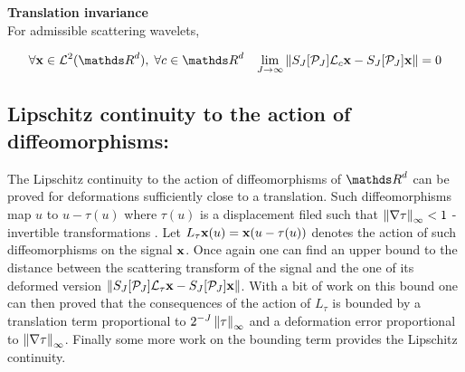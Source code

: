 \documentclass[a4paper,11pt]{report}
\begin{document}
			\begin{thm} \textbf{Translation invariance}\\
				For admissible scattering wavelets,
				
				\begin{equation}
					\forall \bfx \in \mcalL^{2}(\dsR^{d}), \; \forall c \in \dsR^{d} \;\;\; \lim_{J \rightarrow \infty} \norm{S_{J}[\mcalP_{J}]\mcalL_{c}\bfx - S_{J}[\mcalP_{J}]\bfx} = 0
					\label{eq:Tranlation invariance}
				\end{equation}
				\label{thm:Translation invariance}
			  
			\end{thm}

		\subsection{Lipschitz continuity to the action of diffeomorphisms:}
			\label{subsec:ST/Pties/Lipschitz continuity}
			
			The Lipschitz continuity to the action of diffeomorphisms of $\dsR^{d}$ can be proved for deformations sufficiently close to a translation. Such diffeomorphisms map $u$ to $u-\tau(u)$ where $\tau(u)$ is a displacement filed such that $\left\lVert \nabla \tau \right\rVert_{\infty} < 1$ -\ie invertible transformations \cite{bruna2013invariant}. Let $L_{\tau}{\bf x}(u)={\bf x}(u-\tau(u))$ denotes the action of such diffeomorphisms on the signal ${\bf x}$. Once again one can find an upper bound to the distance between the scattering transform of the signal and the one of its deformed version $\left\lVert S_{J}[\mathcal{P}_{J}]\mathcal{L}_{\tau}{\bf x} - S_{J}[\mathcal{P}_{J}]{\bf x} \right\rVert$. With a bit of work on this bound one can then proved that the consequences of the action of $L_{\tau}$ is bounded by a translation term proportional to $2^{-J} \left\lVert \tau \right\rVert_{\infty}$ and a deformation error proportional to $\left\lVert \nabla \tau \right\rVert_{\infty}$. Finally some more work on the bounding term provides the Lipschitz continuity.
			
\end{document}
